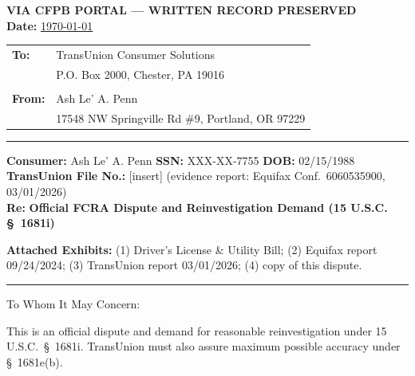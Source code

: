 \documentclass[12pt,letterpaper]{article}
\begin{document}
\begin{center}
  \textbf{VIA CFPB PORTAL --- WRITTEN RECORD PRESERVED} \\
  \textbf{Date:} \underline{\today}
\end{center}

\begin{tabular}{@{}ll}
  \textbf{To:}   & TransUnion Consumer Solutions \\
                 & P.O. Box 2000, Chester, PA 19016 \\
                 & \\
  \textbf{From:} & Ash Le' A. Penn \\
                 & 17548 NW Springville Rd \#9, Portland, OR 97229 \\
\end{tabular}

\vspace{1em}\hrule\vspace{1em}

\textbf{Consumer:} Ash Le' A. Penn \quad \textbf{SSN:} XXX-XX-7755 \quad \textbf{DOB:} 02/15/1988 \\
\textbf{TransUnion File No.:} [insert] \quad (evidence report: Equifax Conf.\ 6060535900, 03/01/2026) \\
\textbf{Re:} \textbf{Official FCRA Dispute and Reinvestigation Demand (15 U.S.C. \S~1681i)}

\vspace{1em}
\textbf{Attached Exhibits:} (1) Driver's License \& Utility Bill; (2) Equifax report 09/24/2024; (3) TransUnion report 03/01/2026; (4) copy of this dispute.

\vspace{1em}\hrule\vspace{1em}

To Whom It May Concern:

This is an official dispute and demand for reasonable reinvestigation under 15 U.S.C.\ \S~1681i. TransUnion must also assure maximum possible accuracy under \S~1681e(b).
\end{document}
